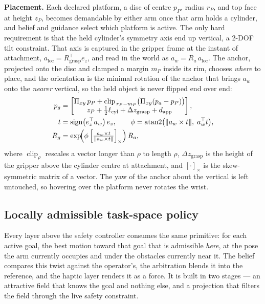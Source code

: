 \textbf{Placement.} Each declared platform, a disc of centre $p_P$, radius $r_P$, and top face at height $z_P$, becomes demandable by either arm once that arm holds a cylinder, and belief and guidance select which platform is active. The only hard requirement is that the held cylinder's symmetry axis end up vertical, a 2-DOF tilt constraint. That axis is captured in the gripper frame at the instant of attachment, $a_{\text{loc}} = R_{\text{grasp}}^{\top}e_z$, and read in the world as $a_w = R_a\,a_{\text{loc}}$. The anchor, projected onto the disc and clamped a margin $m_P$ inside its rim, chooses \emph{where} to place, and the orientation is the minimal rotation of the anchor that brings $a_w$ onto the \emph{nearer} vertical, so the held object is never flipped end over end:
\begin{equation}
\begin{split}
p_g &= \begin{bmatrix} \Pi_{xy}\,p_P + \operatorname{clip}_{\,r_P - m_P}\bigl(\Pi_{xy}(p_a - p_P)\bigr) \\ z_P + \tfrac{1}{2}\ell_{\text{cyl}} + \Delta z_{\text{grasp}} + d_{\text{app}} \end{bmatrix},
\\
t &= \operatorname{sign}\bigl(e_z^{\top}a_w\bigr)\,e_z,
\qquad
\phi = \operatorname{atan2}\bigl(\|a_w \times t\|,\; a_w^{\top}t\bigr),\\
R_g &= \exp\!\Bigl(\phi\,\Bigl[\tfrac{a_w \times t}{\|a_w \times t\|}\Bigr]_{\times}\Bigr)\,R_a,
\end{split}
\label{eq:placegoal}
\end{equation}
where $\operatorname{clip}_{\rho}$ rescales a vector longer than $\rho$ to length $\rho$, $\Delta z_{\text{grasp}}$ is the height of the gripper above the cylinder centre at attachment, and $[\cdot]_{\times}$ is the skew-symmetric matrix of a vector. The yaw of the anchor about the vertical is left untouched, so hovering over the platform never rotates the wrist.

\subsection{Locally admissible task-space policy}
\label{sec:localpolicy}

Every layer above the safety controller consumes the same primitive: for each active goal, the best motion toward that goal that is admissible \emph{here}, at the pose the arm currently occupies and under the obstacles currently near it. The belief compares this twist against the operator's, the arbitration blends it into the reference, and the haptic layer renders it as a force. It is built in two stages --- an attractive field that knows the goal and nothing else, and a projection that filters the field through the live safety constraint.

